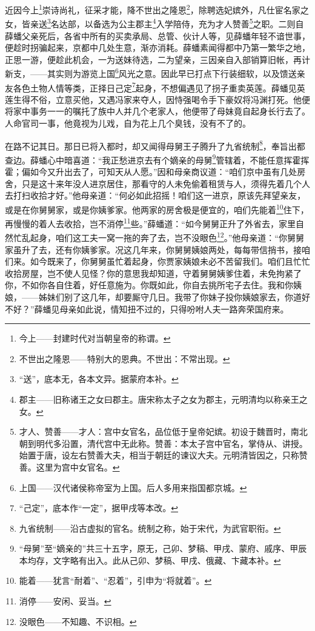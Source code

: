 \par 近因今上\footnote{今上——封建时代对当朝皇帝的称谓。}崇诗尚礼，征采才能，降不世出之隆恩\footnote{不世出之隆恩——特别大的恩典。不世出：不常出现。}，除聘选妃嫔外，凡仕宦名家之女，皆亲送\footnote{“送”，底本无，各本文异。据蒙府本补。}名达部，以备选为公主郡主\footnote{郡主——旧称诸王之女曰郡主。唐宋称太子之女为郡主，元明清均以称亲王之女。}入学陪侍，充为才人赞善\footnote{才人、赞善——才人：宫中女官名，品位低于皇帝妃嫔。初设于魏晋时，南北朝到明代多沿置，清代宫中无此称。赞善：本太子宫中官名，掌侍从、讲授。始置于唐，设左右赞善大夫，相当于朝廷的谏议大夫。元明清皆因之，只称赞善。这里为宫中女官名。}之职。二则自薛蟠父亲死后，各省中所有的买卖承局、总管、伙计人等，见薛蟠年轻不谙世事，便趁时拐骗起来，京都中几处生意，渐亦消耗。薛蟠素闻得都中乃第一繁华之地，正思一游，便趁此机会，一为送妹待选，二为望亲，三因亲自入部销算旧帐，再计新支，——其实则为游览上国\footnote{上国——汉代诸侯称帝室为上国。后人多用来指国都京城。}风光之意。因此早已打点下行装细软，以及馈送亲友各色土物人情等类，正择日己定\footnote{“己定”，底本作“一定”，据甲戌等本改。}起身，不想偏遇见了拐子重卖英莲。薛蟠见英莲生得不俗，立意买他，又遇冯家来夺人，因恃强喝令手下豪奴将冯渊打死。他便将家中事务一一的嘱托了族中人并几个老家人，他便带了母妹竟自起身长行去了。人命官司一事，他竟视为儿戏，自为花上几个臭钱，没有不了的。
\par 在路不记其日。那日已将入都时，却又闻得母舅王子腾升了九省统制\footnote{九省统制——沿古虚拟的官名。统制之称，始于宋代，为武官职衔。}，奉旨出都查边。薛蟠心中暗喜道：“我正愁进京去有个嫡亲的母舅\footnote{“母舅”至“嫡亲的”共三十五字，原无，己卯、梦稿、甲戌、蒙府、戚序、甲辰本均存，文字略有出入。此从己卯、梦稿、甲戌、俄藏、卞藏本补。}管辖着，不能任意挥霍挥霍；偏如今又升出去了，可知天从人愿。”因和母亲商议道：“咱们京中虽有几处房舍，只是这十来年没人进京居住，那看守的人未免偷着租赁与人，须得先着几个人去打扫收拾才好。”他母亲道：“何必如此招摇！咱们这一进京，原该先拜望亲友，或是在你舅舅家，或是你姨爹家。他两家的房舍极是便宜的，咱们先能着\footnote{能着——犹言“耐着”、“忍着”，引申为“将就着”。}住下，再慢慢的着人去收拾，岂不消停\footnote{消停——安闲、妥当。}些。”薛蟠道：“如今舅舅正升了外省去，家里自然忙乱起身，咱们这工夫一窝一拖的奔了去，岂不没眼色\footnote{没眼色——不知趣、不识相。}。”他母亲道：“你舅舅家虽升了去，还有你姨爹家。况这几年来，你舅舅姨娘两处，每每带信捎书，接咱们来。如今既来了，你舅舅虽忙着起身，你贾家姨娘未必不苦留我们。咱们且忙忙收拾房屋，岂不使人见怪？你的意思我却知道，守着舅舅姨爹住着，未免拘紧了你，不如你各自住着，好任意施为。你既如此，你自去挑所宅子去住。我和你姨娘，——姊妹们别了这几年，却要厮守几日。我带了你妹子投你姨娘家去，你道好不好？”薛蟠见母亲如此说，情知扭不过的，只得吩咐人夫一路奔荣国府来。
